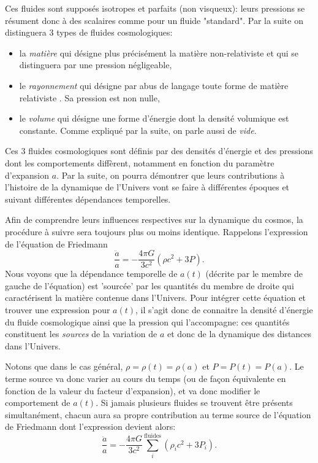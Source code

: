 Ces fluides sont supposés isotropes et parfaits (non visqueux): leurs pressions se résument donc à des scalaires comme pour un fluide "standard". Par la suite on distinguera 3 types de fluides cosmologiques:
\begin{itemize}
\item la \textit{matière} qui désigne plus précisément la matière non-relativiste et qui se distinguera par une pression négligeable,
\item le \textit{rayonnement} qui désigne par abus de langage toute forme de matière relativiste . Sa pression est non nulle,
\item le \textit{volume} qui désigne une forme d'énergie dont la densité volumique est constante. Comme expliqué par la suite, on parle aussi de \textit{vide}.
\end{itemize}
Ces 3 fluides cosmologiques sont définis par des densités d'énergie et des pressions dont les comportements diffèrent, notamment en fonction du paramètre d'expansion $a$. Par la suite, on pourra démontrer que leurs contributions à l'histoire de la dynamique de l'Univers vont se faire à différentes époques et suivant différentes dépendances temporelles.

Afin de comprendre leurs influences respectives sur la dynamique du cosmos, la procédure à suivre sera toujours plus ou moins identique. Rappelons l'expression de l'équation de Friedmann
\begin{equation}
\frac{\ddot a}{a}=-\frac{4\pi G}{3c^2}(\rho c^2 +3 P).
\end{equation}
Nous voyons que la dépendance temporelle de $a(t)$ (décrite par le membre de gauche de l'équation) est 'sourcée' par les quantités du membre de droite qui caractérisent la matière contenue dans l'Univers.
Pour intégrer cette équation et trouver une expression pour $a(t)$, il s'agit donc de connaitre la densité d'énergie du fluide cosmologique ainsi que la pression qui l'accompagne: ces quantités constituent les \textit{sources} de la variation de $a$ et donc de la dynamique des distances dans l'Univers. 

Notons que dans le cas général, $\rho=\rho(t)=\rho(a)$ et $P=P(t)=P(a)$. Le terme source va donc varier au cours du temps (ou de façon équivalente en fonction de la valeur du facteur d'expansion), et va donc modifier le comportement de $a(t)$. Si jamais plusieurs fluides se trouvent être présents simultanément, chacun aura sa propre contribution au terme source de l'équation de Friedmann dont l'expression devient alors:
\begin{equation}
\frac{\ddot a}{a}=-\frac{4\pi G}{3c^2}\sum_i^\mathrm{fluides}(\rho_i c^2 +3 P_i).
\end{equation}

